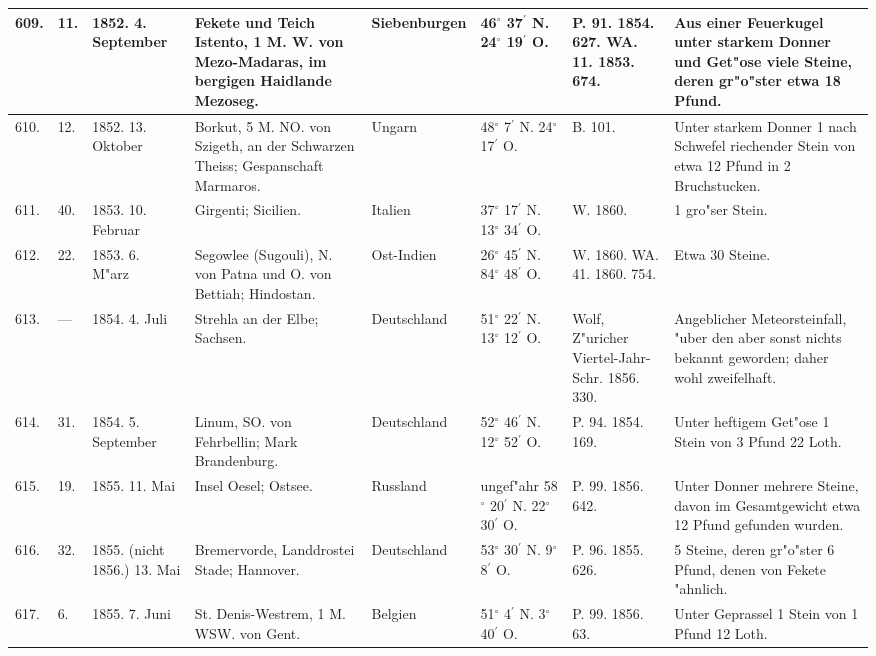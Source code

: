 \documentclass[a4paper, 8pt, oneside, polutonikogreek, german]{article}
\begin{document}
\begin{center}
\begin{longtable}{| p{4mm} | p{2mm} | p{15mm} | p{25mm} | p{16mm} | p{12mm} | p{13mm} | p{20mm} |}
        609. & 11. & 1852. 4. September & Fekete und Teich Istento, 1 M. W. von Mezo-Madaras, im bergigen Haidlande Mezoseg. & Siebenburgen & 46$^\circ$ 37$^\prime$ N. 24$^\circ$ 19$^\prime$ O. & P. 91. 1854. 627. WA. 11. 1853. 674. & Aus einer Feuerkugel unter starkem Donner und Get"ose viele Steine, deren gr"o"ster etwa 18 Pfund. \\ \hline
        610. & 12. & 1852. 13. Oktober & Borkut, 5 M. NO. von Szigeth, an der Schwarzen Theiss; Gespanschaft Marmaros. & Ungarn & 48$^\circ$ 7$^\prime$ N. 24$^\circ$ 17$^\prime$ O. & B. 101. & Unter starkem Donner 1 nach Schwefel riechender Stein von etwa 12 Pfund in 2 Bruchstucken. \\ \hline
        611. & 40. & 1853. 10. Februar & Girgenti; Sicilien. & Italien & 37$^\circ$ 17$^\prime$ N. 13$^\circ$ 34$^\prime$ O. & W. 1860. & 1 gro"ser Stein. \\ \hline
        612. & 22. & 1853. 6. M"arz & Segowlee (Sugouli), N. von Patna und O. von Bettiah; Hindostan. & Ost-Indien & 26$^\circ$ 45$^\prime$ N. 84$^\circ$ 48$^\prime$ O. & W. 1860. WA. 41. 1860. 754. & Etwa 30 Steine. \\ \hline
        613. & --- & 1854. 4. Juli & Strehla an der Elbe; Sachsen. & Deutschland & 51$^\circ$ 22$^\prime$ N. 13$^\circ$ 12$^\prime$ O. & Wolf, Z"uricher Viertel-Jahr-Schr. 1856. 330. & Angeblicher Meteorsteinfall, "uber den aber sonst nichts bekannt geworden; daher wohl zweifelhaft. \\ \hline
        614. & 31. & 1854. 5. September & Linum, SO. von Fehrbellin; Mark Brandenburg. & Deutschland & 52$^\circ$ 46$^\prime$ N. 12$^\circ$ 52$^\prime$ O. & P. 94. 1854. 169. & Unter heftigem Get"ose 1 Stein von 3 Pfund 22 Loth. \\ \hline
        615. & 19. & 1855. 11. Mai & Insel Oesel; Ostsee. & Russland & ungef"ahr 58$^\circ$ 20$^\prime$ N. 22$^\circ$ 30$^\prime$ O. & P. 99. 1856. 642. & Unter Donner mehrere Steine, davon im Gesamtgewicht etwa 12 Pfund gefunden wurden. \\ \hline
        616. & 32. & 1855. (nicht 1856.) 13. Mai & Bremervorde, Landdrostei Stade; Hannover. & Deutschland & 53$^\circ$ 30$^\prime$ N. 9$^\circ$ 8$^\prime$ O. & P. 96. 1855. 626. & 5 Steine, deren gr"o"ster 6 Pfund, denen von Fekete "ahnlich. \\ \hline
        617. & 6. & 1855. 7. Juni & St. Denis-Westrem, 1 M. WSW. von Gent. & Belgien & 51$^\circ$ 4$^\prime$ N. 3$^\circ$ 40$^\prime$ O. & P. 99. 1856. 63. & Unter Geprassel 1 Stein von 1 Pfund 12 Loth. \\ \hline

\end{longtable}
\end{center}
\end{document}
